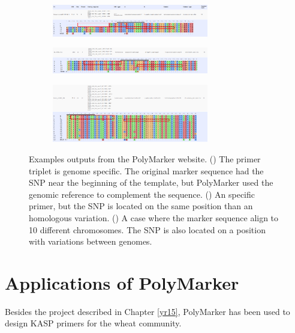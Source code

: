 \begin{figure}
\centering
\begin{subfigure}{1\textwidth}
\caption{}
\centering
\label{fig:poly:non-hom-sp}
\includegraphics[width=0.75\textwidth]{PolyMarker/Figures/website/non-hom-sp.png}
\end{subfigure}
\begin{subfigure}{1\textwidth}
\caption{}
\centering
\label{fig:poly:hom-sp}
\includegraphics[width=0.75\textwidth]{PolyMarker/Figures/website/hom-sp.png}
\end{subfigure}
\begin{subfigure}{1\textwidth}
\caption{}
\centering
\label{fig:poly:hom-multi}
\includegraphics[width=0.75\textwidth]{PolyMarker/Figures/website/hom-multi.png}
\end{subfigure}
\caption[Examples outputs from the PolyMarker website.]{Examples outputs from the PolyMarker website. () The primer triplet is genome specific. The original marker sequence had the SNP near the beginning of the template, but PolyMarker used the genomic reference to complement the sequence. () An specific primer, but the SNP is located on the same position than an homologous variation. () A case where the marker sequence align to 10 different chromosomes. The SNP is also located on a position with variations between genomes.}
\label{fig:poly:website}
\end{figure}


\section{Applications of PolyMarker}
Besides the project described in Chapter \ref{yr15}, PolyMarker has been used to design KASP primers for the wheat community.


